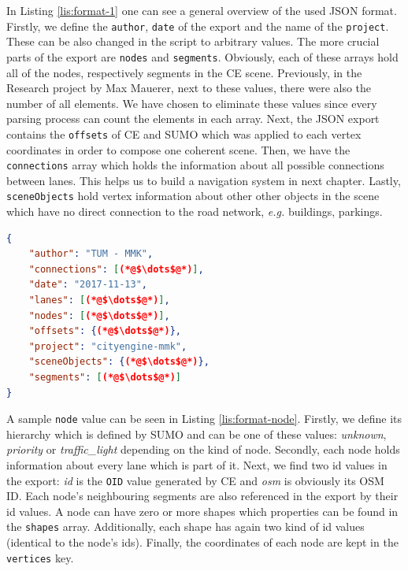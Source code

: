 In Listing \ref{lis:format-1} one can see a general overview of the used JSON format. Firstly, we define the \texttt{author}, \texttt{date} of the export and the name of the \texttt{project}. These can be also changed in the script to arbitrary values. The more crucial parts of the export are \texttt{nodes} and \texttt{segments}. Obviously, each of these arrays hold all of the nodes, respectively segments in the CE scene. Previously, in the Research project by Max Mauerer, next to these values, there were also the number of all elements. We have chosen to eliminate these values since every parsing process can count the elements in each array. Next, the JSON export contains the \texttt{offsets} of CE and SUMO which was applied to each vertex coordinates in order to compose one coherent scene. Then, we have the \texttt{connections} array which holds the information about all possible connections between lanes. This helps us to build a navigation system in next chapter. Lastly, \texttt{sceneObjects} hold vertex information about other other objects in the scene which have no direct connection to the road network, \emph{e.g.} buildings, parkings.\\

    \begin{scriptsize}
	   \begin{lstlisting}[language=json,firstnumber=1,caption={General overview of the used JSON format for description of road networks.},label={lis:format-1}]
{
    "author": "TUM - MMK",
    "connections": [(*@$\dots$@*)],
    "date": "2017-11-13",
    "lanes": [(*@$\dots$@*)],
    "nodes": [(*@$\dots$@*)],
    "offsets": {(*@$\dots$@*)},
    "project": "cityengine-mmk",
    "sceneObjects": {(*@$\dots$@*)},
    "segments": [(*@$\dots$@*)]
}
	   \end{lstlisting}
    \end{scriptsize}

A sample \texttt{node} value can be seen in Listing \ref{lis:format-node}. Firstly, we define its hierarchy which is defined by SUMO and can be one of these values: \emph{unknown}, \emph{priority} or \emph{traffic\_light} depending on the kind of node. Secondly, each node holds information about every lane which is part of it. Next, we find two id values in the export: \emph{id} is the \texttt{OID} value generated by CE and \emph{osm} is obviously its OSM ID. Each node's neighbouring segments are also referenced in the export by their id values. A node can have zero or more shapes which properties can be found in the \texttt{shapes} array. Additionally, each shape has again two kind of id values (identical to the node's ids). Finally, the coordinates of each node are kept in the \texttt{vertices} key.\\
 	
